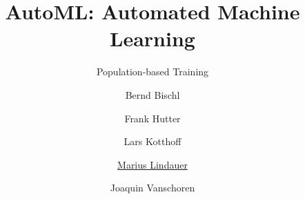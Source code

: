 




\title[AutoML: Learning to Configure]{AutoML: Automated Machine Learning}
\subtitle{Population-based Training}
\author[Marius Lindauer]{Bernd Bischl \and Frank Hutter \and Lars Kotthoff\newline \and \underline{Marius Lindauer} \and Joaquin Vanschoren}
\institute{}
\date{}





	
	\maketitle
	
